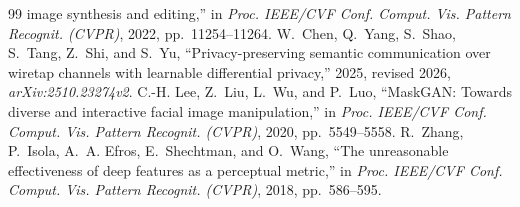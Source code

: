 \documentclass[10pt,twocolumn,letterpaper]{article}
\theoremstyle{plain}
\theoremstyle{definition}
\begin{document}
\begin{thebibliography}{99}
image synthesis and editing,'' in \emph{Proc. IEEE/CVF Conf. Comput. Vis.
Pattern Recognit. (CVPR)}, 2022, pp.~11254--11264.
 W.~Chen, Q.~Yang, S.~Shao, S.~Tang, Z.~Shi, and S.~Yu,
``Privacy-preserving semantic communication over wiretap channels with learnable
differential privacy,'' 2025, revised 2026, \emph{arXiv:2510.23274v2}.
 C.-H. Lee, Z.~Liu, L.~Wu, and P.~Luo, ``MaskGAN:
Towards diverse and interactive facial image manipulation,'' in \emph{Proc.
IEEE/CVF Conf. Comput. Vis. Pattern Recognit. (CVPR)}, 2020, pp.~5549--5558.
 R.~Zhang, P.~Isola, A.~A. Efros, E.~Shechtman, and O.~Wang,
``The unreasonable effectiveness of deep features as a perceptual metric,'' in
\emph{Proc. IEEE/CVF Conf. Comput. Vis. Pattern Recognit. (CVPR)}, 2018,
pp.~586--595.
\end{thebibliography}
\end{document}
